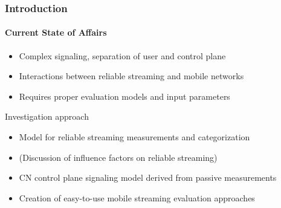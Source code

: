 \documentclass{beamer}
\begin{document}
\begin{frame}
	\frametitle{Introduction}
	\framesubtitle{Current State of Affairs}

	\begin{itemize}
		\item Complex signaling, separation of user and control plane
		\item Interactions between reliable streaming and mobile networks
		\item Requires proper evaluation models and input parameters
	\end{itemize}

	\pause
	\begin{block}{Investigation approach}
	\begin{itemize}
		\item Model for reliable streaming measurements and categorization
		\item (Discussion of influence factors on reliable streaming)
		\item CN control plane signaling model derived from passive measurements
		\item Creation of easy-to-use mobile streaming evaluation approaches
	\end{itemize}
	\end{block}
\end{frame}
\end{document}
